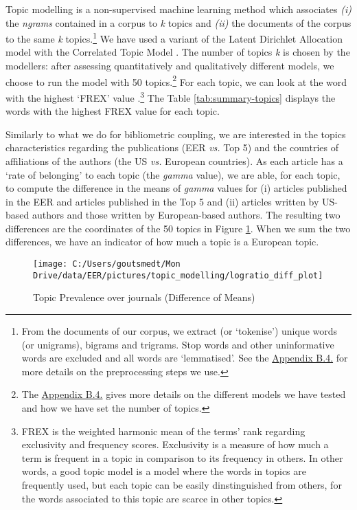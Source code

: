 \documentclass[]{elsarticle} %
\begin{document}
Topic modelling is a non-supervised machine learning method which
associates \emph{(i)} the \emph{ngrams} contained in a corpus to
\emph{k} topics and \emph{(ii)} the documents of the corpus to the same
\emph{k} topics.\footnote{From the documents of our corpus, we extract
  (or `tokenise') unique words (or unigrams), bigrams and trigrams. Stop
  words and other uninformative words are excluded and all words are
  `lemmatised'. See the \protect\hyperlink{topic}{Appendix B.4.} for
  more details on the preprocessing steps we use.} We have used a
variant of the Latent Dirichlet Allocation model with the Correlated
Topic Model \citep{blei2007}. The number of topics \emph{k} is chosen by
the modellers: after assessing quantitatively and qualitatively
different models, we choose to run the model with 50 topics.\footnote{The
  \protect\hyperlink{topic}{Appendix B.4.} gives more details on the
  different models we have tested and how we have set the number of
  topics.} For each topic, we can look at the word with the highest
`FREX' value \citep{bischof2012}.\footnote{FREX is the weighted harmonic
  mean of the terms' rank regarding exclusivity and frequency scores.
  Exclusivity is a measure of how much a term is frequent in a topic in
  comparison to its frequency in others. In other words, a good topic
  model is a model where the words in topics are frequently used, but
  each topic can be easily dinstinguished from others, for the words
  associated to this topic are scarce in other topics.} The Table
\ref{tab:summary-topics} displays the words with the highest FREX value
for each topic.

Similarly to what we do for bibliometric coupling, we are interested in
the topics characteristics regarding the publications (EER \emph{vs.}
Top 5) and the countries of affiliations of the authors (the US
\emph{vs.} European countries). As each article has a `rate of
belonging' to each topic (the \emph{gamma} value), we are able, for each
topic, to compute the difference in the means of \emph{gamma} values for
(i) articles published in the EER and articles published in the Top 5
and (ii) articles written by US-based authors and those written by
European-based authors. The resulting two differences are the
coordinates of the 50 topics in Figure \ref{fig:plot-topic-diff}. When
we sum the two differences, we have an indicator of how much a topic is
a European topic.

\begin{figure}[h]

{\centering \texttt{[image: C:/Users/goutsmedt/Mon Drive/data/EER/pictures/topic\_modelling/logratio\_diff\_plot]} 

}

\caption{Topic Prevalence over journals (Difference of Means)}\label{fig:plot-topic-diff}
\end{figure}
\end{document}
